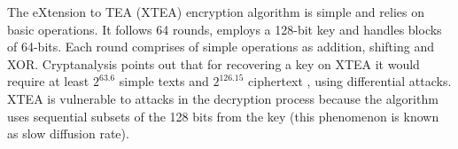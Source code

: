 The eXtension to TEA (XTEA) encryption algorithm is simple and relies on basic operations. It follows 
64 rounds, employs a 128-bit key and handles blocks of 64-bits. Each round comprises of simple operations as addition, shifting and XOR. %
%
%
Cryptanalysis points out that %
for recovering a key on XTEA it would require at least $2^{63.6}$ simple texts and $2^{126.15}$ ciphertext%
, using differential attacks. XTEA is vulnerable to attacks in the decryption process because the algorithm uses sequential subsets of the 128 bits from the key (this phenomenon is known as slow diffusion rate). %


